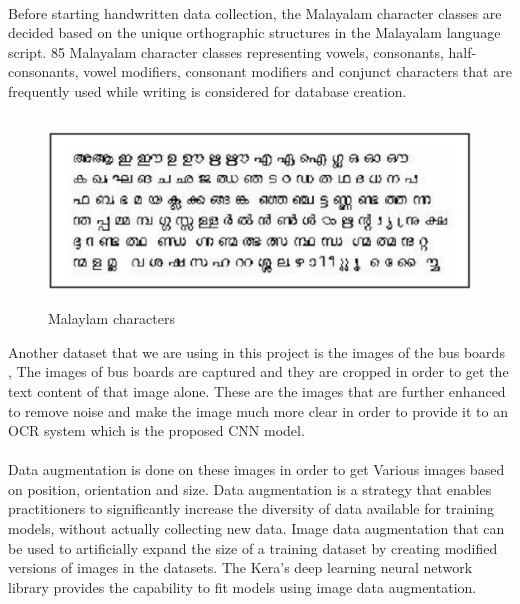 \documentclass[a4paper,12pt]{report}
\begin{document}
\paragraph{}
Before starting handwritten data collection, the Malayalam character classes are decided based on the unique orthographic structures in the Malayalam language script. 85 Malayalam character classes representing vowels, consonants, half-consonants, vowel modifiers, consonant modifiers and conjunct characters that are frequently used while writing is considered for database creation. 

\vspace*{0.1cm}
\begin{figure}[!h]
	\begin{center}
		\includegraphics[width=12cm , height= 5cm]{dataset.png}    
		\caption{Malaylam characters}
		\label{fig1}
	\end{center}
\end{figure}
\vspace*{0.2cm}


Another dataset that we are using in this project is the images of the bus boards , The images of bus boards are captured and they are cropped in order to get the text content of that image alone. These are the images that are further enhanced to remove noise and make the image much more clear in order to provide it to an OCR system which is the proposed CNN model.


\paragraph{}
Data augmentation is done on these images in order to get Various images based on position, orientation and size. Data augmentation is a strategy that enables practitioners to significantly increase the diversity of data available for training models, without actually collecting new data. Image data augmentation that can be used to artificially expand the size of a training dataset by creating modified versions of images in the datasets. The Kera’s deep learning neural network library provides the capability to fit models using image data augmentation.
\end{document}
